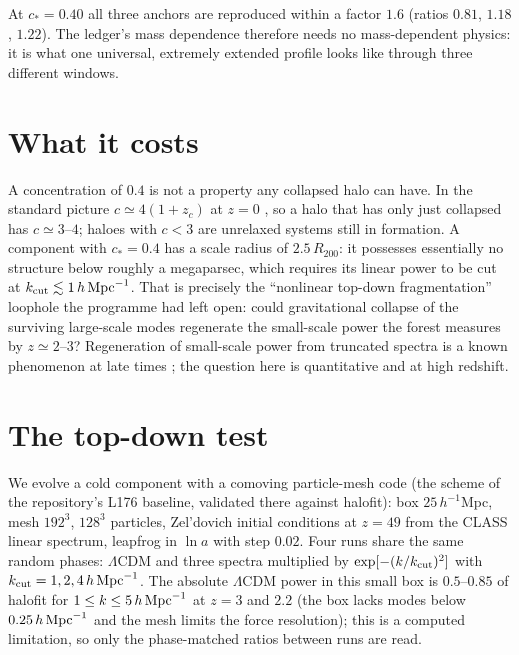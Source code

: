 \documentclass[11pt,letterpaper]{article}
\begin{document}
At $c_*=0.40$ all three anchors are reproduced within a factor $1.6$ (ratios $0.81$, $1.18$, $1.22$). The ledger's mass dependence therefore needs no mass-dependent physics: it is what one universal, extremely extended profile looks like through three different windows.

\section{What it costs}
A concentration of $0.4$ is not a property any collapsed halo can have. In the standard picture $c\simeq4(1+z_c)$ at $z=0$ \cite{bullock,wechsler}, so a halo that has only just collapsed has $c\simeq3$--$4$; haloes with $c<3$ are unrelaxed systems still in formation. A component with $c_*=0.4$ has a scale radius of $2.5\,R_{200}$: it possesses essentially no structure below roughly a megaparsec, which requires its linear power to be cut at $k_{\rm cut}\lesssim1\,h\,{\rm Mpc}^{-1}$. That is precisely the ``nonlinear top-down fragmentation'' loophole the programme had left open: could gravitational collapse of the surviving large-scale modes regenerate the small-scale power the forest measures by $z\simeq2$--$3$? Regeneration of small-scale power from truncated spectra is a known phenomenon at late times \cite{lwp}; the question here is quantitative and at high redshift.

\section{The top-down test}
We evolve a cold component with a comoving particle-mesh code (the scheme of the repository's L176 baseline, validated there against halofit): box $25\,h^{-1}$Mpc, mesh $192^3$, $128^3$ particles, Zel'dovich initial conditions at $z=49$ from the CLASS linear spectrum, leapfrog in $\ln a$ with step $0.02$. Four runs share the same random phases: $\Lambda$CDM and three spectra multiplied by $\exp[-(k/k_{\rm cut})^2]$ with $k_{\rm cut}=1,2,4\,h\,{\rm Mpc}^{-1}$. The absolute $\Lambda$CDM power in this small box is $0.5$--$0.85$ of halofit for $1\le k\le5\,h\,{\rm Mpc}^{-1}$ at $z=3$ and $2.2$ (the box lacks modes below $0.25\,h\,{\rm Mpc}^{-1}$ and the mesh limits the force resolution); this is a computed limitation, so only the phase-matched ratios between runs are read.
\end{document}
